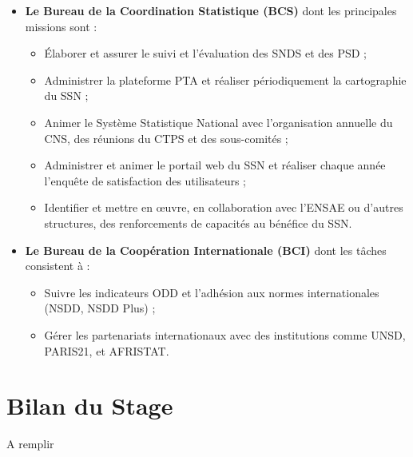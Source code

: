 \begin{simplebox}
\begin{itemize}
    \item \textbf{Le Bureau de la Coordination Statistique (BCS)} dont les principales missions sont :
    \begin{itemize}
        \item Élaborer et assurer le suivi et l’évaluation des SNDS et des PSD ;
        \item Administrer la plateforme PTA et réaliser périodiquement la cartographie du SSN ;
        \item Animer le Système Statistique National avec l’organisation annuelle du CNS, 
        des réunions du CTPS et des sous-comités ;
        \item Administrer et animer le portail web du SSN et réaliser chaque année 
        l’enquête de satisfaction des utilisateurs ;
        \item Identifier et mettre en œuvre, en collaboration avec l’ENSAE ou d’autres structures, 
        des renforcements de capacités au bénéfice du SSN.
    \end{itemize}

    \item \textbf{Le Bureau de la Coopération Internationale (BCI)} dont les tâches consistent à :
    \begin{itemize}
        \item Suivre les indicateurs ODD et l’adhésion aux normes internationales (NSDD, NSDD Plus) ;
        \item Gérer les partenariats internationaux avec des institutions comme UNSD, PARIS21, et AFRISTAT.
    \end{itemize}
\end{itemize}
\end{simplebox}



\section{Bilan du Stage}
A  remplir
